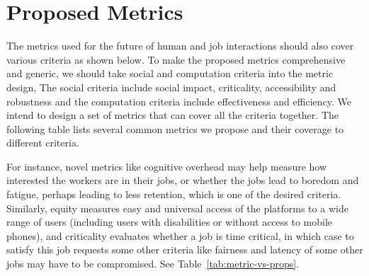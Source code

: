 \section{Proposed Metrics}\label{sec:metrics}
The metrics used for the future of human and job interactions should also cover various criteria as shown below. To make the proposed metrics comprehensive and generic, we should take social and computation criteria into the metric design, The social  criteria include social impact, criticality, accessibility and robustness and the computation criteria include effectiveness and efficiency. We intend to design a set of metrics that can cover all the criteria together. The following table lists several common metrics we propose and their coverage to different criteria.  
\par
For instance, novel metrics like cognitive overhead may help measure how interested the workers are in their jobs, or whether the jobs lead to boredom and fatigue, perhaps leading to less retention, which is one of the desired criteria. Similarly, equity measures easy and universal access of the platforms to a wide range of users (including users with disabilities or without access to mobile phones), and criticality evaluates whether a job is time critical, in which case to satisfy this job requests some other criteria like fairness and latency of some other jobs may have to be compromised. See Table~\ref{tab:metric-vs-props}.

